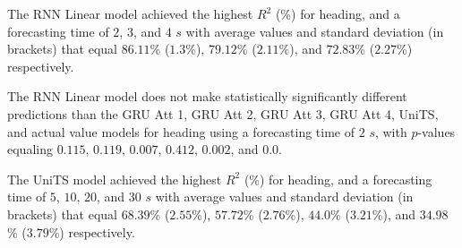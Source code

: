\begin{table}[!ht]
	\centering
	\caption{The average $R^{2}$ (\%), with standard deviation in brackets, across k-fold validation datasets for the heading estimated on the k-fold testing datasets by different RNN models, and forecasting times.}
	\label{tab:best_direction_R2}
\end{table}

The RNN Linear model achieved the highest $R^{2}$ (\%) for heading, and a forecasting time of $2$, $3$, and $4$ $s$ with average values and standard deviation (in brackets) that equal $86.11$\% ($1.3$\%), $79.12$\% ($2.11$\%), and $72.83$\% ($2.27$\%) respectively.

The RNN Linear model does not make statistically significantly different predictions than the GRU Att 1, GRU Att 2, GRU Att 3, GRU Att 4, UniTS, and actual value models for heading using a forecasting time of $2$ $s$, with $p$-values equaling $0.115$, $0.119$, $0.007$, $0.412$, $0.002$, and $0.0$.


The UniTS model achieved the highest $R^{2}$ (\%) for heading, and a forecasting time of $5$, $10$, $20$, and $30$ $s$ with average values and standard deviation (in brackets) that equal $68.39$\% ($2.55$\%), $57.72$\% ($2.76$\%), $44.0$\% ($3.21$\%), and $34.98$\% ($3.79$\%) respectively.

